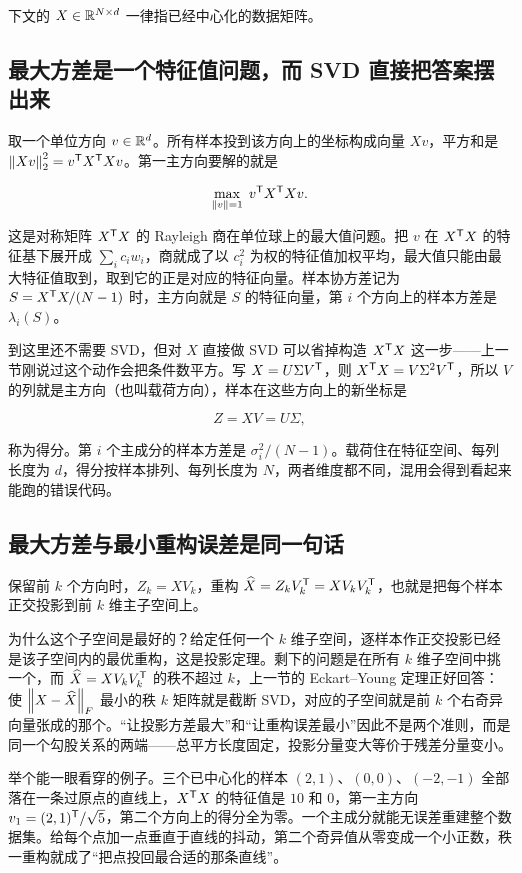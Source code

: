 下文的 \(X\in\mathbb{R}^{N\times d}\) 一律指已经中心化的数据矩阵。

\subsection{最大方差是一个特征值问题，而 SVD 直接把答案摆出来}

取一个单位方向 \(v\in\mathbb{R}^d\)。所有样本投到该方向上的坐标构成向量 \(Xv\)，平方和是 \(\left\lVert Xv\right\rVert_2^2=v^{\mathsf{T}}X^{\mathsf{T}}Xv\)。第一主方向要解的就是

\[
\max_{\left\lVert v\right\rVert=1}\;v^{\mathsf{T}}X^{\mathsf{T}}Xv .
\]

这是对称矩阵 \(X^{\mathsf{T}}X\) 的 Rayleigh 商在单位球上的最大值问题。把 \(v\) 在 \(X^{\mathsf{T}}X\) 的特征基下展开成 \(\sum_ic_iw_i\)，商就成了以 \(c_i^2\) 为权的特征值加权平均，最大值只能由最大特征值取到，取到它的正是对应的特征向量。样本协方差记为 \(S=X^{\mathsf{T}}X/(N-1)\) 时，主方向就是 \(S\) 的特征向量，第 \(i\) 个方向上的样本方差是 \(\lambda_i(S)\)。

到这里还不需要 SVD，但对 \(X\) 直接做 SVD 可以省掉构造 \(X^{\mathsf{T}}X\) 这一步——上一节刚说过这个动作会把条件数平方。写 \(X=U\Sigma V^{\mathsf{T}}\)，则 \(X^{\mathsf{T}}X=V\Sigma^2V^{\mathsf{T}}\)，所以 \(V\) 的列就是主方向（也叫载荷方向），样本在这些方向上的新坐标是

\[
Z=XV=U\Sigma ,
\]

称为得分。第 \(i\) 个主成分的样本方差是 \(\sigma_i^2/(N-1)\)。载荷住在特征空间、每列长度为 \(d\)，得分按样本排列、每列长度为 \(N\)，两者维度都不同，混用会得到看起来能跑的错误代码。

\subsection{最大方差与最小重构误差是同一句话}

保留前 \(k\) 个方向时，\(Z_k=XV_k\)，重构 \(\widehat X=Z_kV_k^{\mathsf{T}}=XV_kV_k^{\mathsf{T}}\)，也就是把每个样本正交投影到前 \(k\) 维主子空间上。

为什么这个子空间是最好的？给定任何一个 \(k\) 维子空间，逐样本作正交投影已经是该子空间内的最优重构，这是投影定理。剩下的问题是在所有 \(k\) 维子空间中挑一个，而 \(\widehat X=XV_kV_k^{\mathsf{T}}\) 的秩不超过 \(k\)，上一节的 Eckart--Young 定理正好回答：使 \(\left\lVert X-\widehat X\right\rVert_F\) 最小的秩 \(k\) 矩阵就是截断 SVD，对应的子空间就是前 \(k\) 个右奇异向量张成的那个。``让投影方差最大''和``让重构误差最小''因此不是两个准则，而是同一个勾股关系的两端——总平方长度固定，投影分量变大等价于残差分量变小。

举个能一眼看穿的例子。三个已中心化的样本 \((2,1)\)、\((0,0)\)、\((-2,-1)\) 全部落在一条过原点的直线上，\(X^{\mathsf{T}}X\) 的特征值是 \(10\) 和 \(0\)，第一主方向 \(v_1=(2,1)^{\mathsf{T}}/\sqrt5\)，第二个方向上的得分全为零。一个主成分就能无误差重建整个数据集。给每个点加一点垂直于直线的抖动，第二个奇异值从零变成一个小正数，秩一重构就成了``把点投回最合适的那条直线''。

